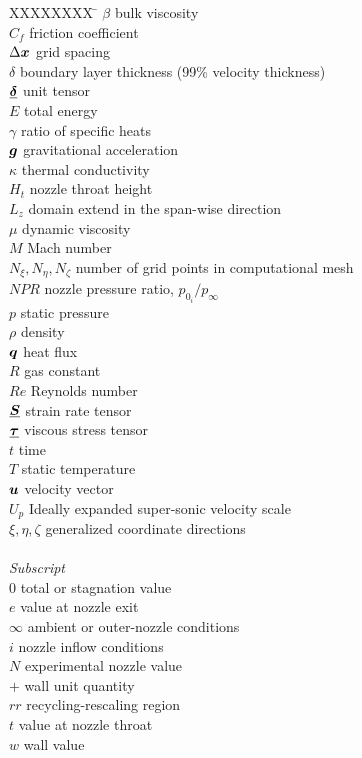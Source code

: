 \documentclass[]{aiaa-tc}%
\def\bgk#1{\mbox{\boldmath $#1$}}
\def\vec#1{\bgk{ #1}}
\def\ten#1{\underline{\bgk{ #1}}}
\begin{document}
\begin{tabbing}
  XXXXXXXX \= \kill%
  $\beta$ \> bulk viscosity \\
  $C_f$ \> friction coefficient \\
  $\Delta\vec{x}$ \> grid spacing \\
  $\delta$  \> boundary layer thickness (99\% velocity thickness) \\
  $\ten{\delta}$ \> unit tensor \\
  $E$ \> total energy \\
  $\gamma$ \> ratio of specific heats \\
  $\vec{g}$ \> gravitational acceleration \\
  $\kappa$ \> thermal conductivity \\
  $H_t$ \> nozzle throat height \\
  $L_z$ \> domain extend in the span-wise direction \\
  $\mu$ \> dynamic viscosity \\
  $M$ \> Mach number \\
  $N_\xi,N_\eta,N_\zeta$ \> number of grid points in computational mesh \\
  $NPR$ \> nozzle pressure ratio, $p_{0_{i}}/p_\infty$ \\
  $p$ \> static pressure \\
  $\rho$ \> density \\
  $\vec{q}$ \> heat flux \\
  $R$ \> gas constant \\
  $Re$ \> Reynolds number \\
  $\ten{S}$ \> strain rate tensor \\
  $\ten{\tau}$ \> viscous stress tensor \\
  $t$ \> time \\
  $T$ \> static temperature \\
  $\vec{u}$ \> velocity vector \\
  $U_p$ \> Ideally expanded super-sonic velocity scale \\ 
  $\xi,\eta,\zeta$ \> generalized coordinate directions \\
  \\
  \textit{Subscript}\\
  $0$ \> total or stagnation value \\
  $e$ \> value at nozzle exit \\
  $\infty$ \> ambient or outer-nozzle conditions \\
  $i$ \> nozzle inflow conditions \\
  $N$ \> experimental nozzle value \\
  $+$ \> wall unit quantity \\
  $rr$ \> recycling-rescaling region \\
  $t$ \> value at nozzle throat \\
  $w$ \> wall value \\
 \end{tabbing}
 
\end{document}
